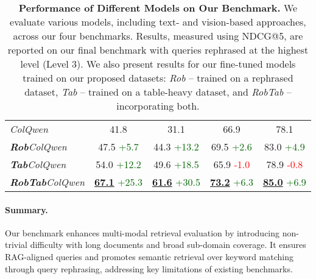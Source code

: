 \begin{table}[ht!]
\begin{tabular}{@{\extracolsep{\fill}}lcccc}
\addlinespace
\textit{ColQwen}   & 41.8 & 31.1 & 66.9 & 78.1  \\
\textit{\textbf{Rob}ColQwen}  & 47.5 {\tiny \textcolor{DarkGreen}{+5.7}}  & 44.3 {\tiny \textcolor{DarkGreen}{+13.2}}  & 69.5 {\tiny \textcolor{DarkGreen}{+2.6}}  & 83.0 {\tiny \textcolor{DarkGreen}{+4.9}}  \\
\textit{\textbf{Tab}ColQwen}  & 54.0 {\tiny \textcolor{DarkGreen}{+12.2}}  & 49.6 {\tiny \textcolor{DarkGreen}{+18.5}}  & 65.9 {\tiny \textcolor{red}{-1.0}}  & 78.9 {\tiny \textcolor{red}{-0.8}}  \\
\textit{\textbf{RobTab}ColQwen}  & \textbf{\underline{67.1}} {\tiny \textcolor{DarkGreen}{+25.3}}  & \textbf{\underline{61.6}} {\tiny \textcolor{DarkGreen}{+30.5}}  & \textbf{\underline{73.2}} {\tiny \textcolor{DarkGreen}{+6.3}}  & \textbf{\underline{85.0}} {\tiny \textcolor{DarkGreen}{+6.9}}  \\

\bottomrule
\end{tabular}
\caption{
\textbf{Performance of Different Models on Our Benchmark.}  
We evaluate various models, including text- and vision-based approaches, across our four benchmarks. Results, measured using NDCG@5, are reported on our final benchmark with queries rephrased at the highest level (Level 3). We also present results for our fine-tuned models trained on our proposed datasets: \emph{Rob} – trained on a rephrased dataset, \emph{Tab} – trained on a table-heavy dataset, and \emph{RobTab} – incorporating both.
}
\label{Table:model_comparisons_on_benchmarks}
\vspace{-0.4cm}
\end{table}

\paragraph{Summary.}
Our benchmark enhances multi-modal retrieval evaluation by introducing non-trivial difficulty with long documents and broad sub-domain coverage. It ensures RAG-aligned queries and promotes semantic retrieval over keyword matching through query rephrasing, addressing key limitations of existing benchmarks.


